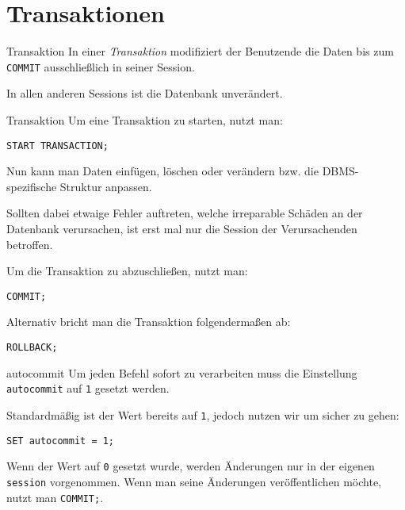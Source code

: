 \section{Transaktionen}

\begin{defi}{Transaktion}
    In einer \emph{Transaktion} modifiziert der Benutzende die Daten bis zum \texttt{COMMIT} ausschließlich in seiner Session.
    
    In allen anderen Sessions ist die Datenbank unverändert.
\end{defi}

\begin{sql}{Transaktion}
    Um eine Transaktion zu starten, nutzt man:

    \begin{lstlisting}[language=mysql]
        START TRANSACTION;
    \end{lstlisting}

    Nun kann man Daten einfügen, löschen oder verändern bzw. die DBMS-spezifische Struktur anpassen.
    
    Sollten dabei etwaige Fehler auftreten, welche irreparable Schäden an der Datenbank verursachen, ist erst mal nur die Session der Verursachenden betroffen.

    Um die Transaktion zu abzuschließen, nutzt man:

    \begin{lstlisting}[language=mysql]
        COMMIT;
    \end{lstlisting}

    Alternativ bricht man die Transaktion folgendermaßen ab:

    \begin{lstlisting}[language=mysql]
        ROLLBACK;
    \end{lstlisting}
\end{sql}

\begin{sql}{autocommit}
    Um jeden Befehl sofort zu verarbeiten muss die Einstellung \texttt{autocommit} auf \texttt{1} gesetzt werden.
    
    Standardmäßig ist der Wert bereits auf \texttt{1}, jedoch nutzen wir um sicher zu gehen:

    \begin{lstlisting}[language=mysql]
        SET autocommit = 1;
    \end{lstlisting}

    Wenn der Wert auf \texttt{0} gesetzt wurde, werden Änderungen nur in der eigenen \texttt{session} vorgenommen.
    Wenn man seine Änderungen veröffentlichen möchte, nutzt man \texttt{COMMIT;}.
\end{sql}

